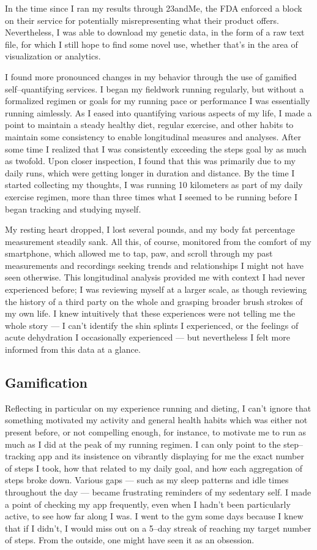 \documentclass{article}
\begin{document}
In the time since I ran my results through 23andMe,
the FDA enforced a block on their service for potentially misrepresenting what their product offers.
Nevertheless,
I was able to download my genetic data,
in the form of a raw text file,
for which I still hope to find some novel use,
whether that's in the area of visualization or analytics.

I found more pronounced changes in my behavior through the use of gamified self--quantifying services.
I began my fieldwork running regularly,
but without a formalized regimen or goals for my running pace or performance I was essentially running aimlessly.
As I eased into quantifying various aspects of my life,
I made a point to maintain a steady healthy diet,
regular exercise,
and other habits to maintain some consistency to enable longitudinal measures and analyses.
After some time I realized that I was consistently exceeding the steps goal by as much as twofold.
Upon closer inspection,
I found that this was primarily due to my daily runs,
which were getting longer in duration and distance.
By the time I started collecting my thoughts,
I was running 10 kilometers as part of my daily exercise regimen,
more than three times what I seemed to be running before I began tracking and studying myself.

My resting heart dropped,
I lost several pounds,
and my body fat percentage measurement steadily sank.
All this,
of course,
monitored from the comfort of my smartphone,
which allowed me to tap,
paw,
and scroll through my past measurements and recordings seeking trends and relationships I might not have seen otherwise.
This longitudinal analysis provided me with context I had never experienced before;
I was reviewing myself at a larger scale,
as though reviewing the history of a third party on the whole and grasping broader brush strokes of my own life.
I knew intuitively that these experiences were not telling me the whole story
--- I can't identify the shin splints I experienced,
or the feelings of acute dehydration I occasionally experienced
--- but nevertheless I felt more informed from this data at a glance.

\subsection*{Gamification}
Reflecting in particular on my experience running and dieting,
I can't ignore that something motivated my activity and general health habits which was either not present before,
or not compelling enough,
for instance,
to motivate me to run as much as I did at the peak of my running regimen.
I can only point to the step--tracking app and its insistence on vibrantly displaying for me the exact number of steps I took,
how that related to my daily goal,
and how each aggregation of steps broke down.
Various gaps
--- such as my sleep patterns and idle times throughout the day ---
became frustrating reminders of my sedentary self.
I made a point of checking my app frequently,
even when I hadn't been particularly active,
to see how far along I was.
I went to the gym some days because I knew that if I didn't,
I would miss out on a 5--day streak of reaching my target number of steps.
From the outside,
one might have seen it as an obsession.
\end{document}
